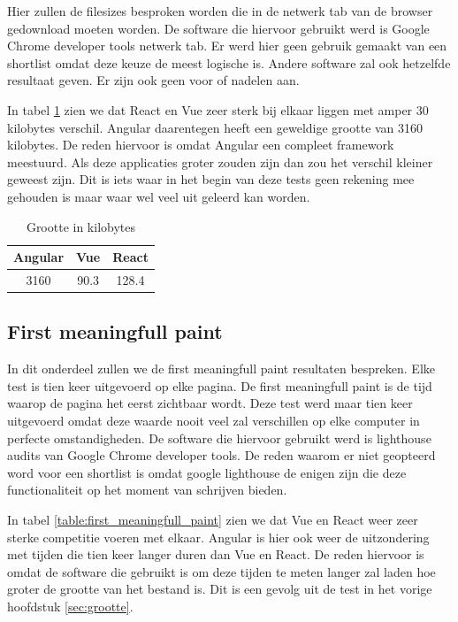Hier zullen de filesizes besproken worden die in de netwerk tab van de browser gedownload moeten worden. De software die hiervoor gebruikt werd is Google Chrome developer tools netwerk tab. Er werd hier geen gebruik gemaakt van een shortlist omdat deze keuze de meest logische is. Andere software zal ook hetzelfde resultaat geven. Er zijn ook geen voor of nadelen aan.

In tabel \ref{table:file_sizes} zien we dat React en Vue zeer sterk bij elkaar liggen met amper 30 kilobytes verschil. Angular daarentegen heeft een geweldige grootte van 3160 kilobytes. De reden hiervoor is omdat Angular een compleet framework meestuurd. Als deze applicaties groter zouden zijn dan zou het verschil kleiner geweest zijn. Dit is iets waar in het begin van deze tests geen rekening mee gehouden is maar waar wel veel uit geleerd kan worden.

\begin{table}[]
	\centering
	\caption{Grootte in kilobytes}
	\label{table:file_sizes}
	\begin{tabular}{|c|c|c|} \hline
		Angular &Vue   &React \\ \hline
		3160     &90.3  &128.4 \\ \hline
	\end{tabular}
\end{table}

\subsection{First meaningfull paint}
\label{sec:first_meaningfull_paint}

In dit onderdeel zullen we de first meaningfull paint resultaten bespreken. Elke test is tien keer uitgevoerd op elke pagina. De first meaningfull paint is de tijd waarop de pagina het eerst zichtbaar wordt. Deze test werd maar tien keer uitgevoerd omdat deze waarde nooit veel zal verschillen op elke computer in perfecte omstandigheden. De software die hiervoor gebruikt werd is lighthouse audits van Google Chrome developer tools. De reden waarom er niet geopteerd word voor een shortlist is omdat google lighthouse de enigen zijn die deze functionaliteit op het moment van schrijven bieden.

In tabel \ref{table:first_meaningfull_paint} zien we dat Vue en React weer zeer sterke competitie voeren met elkaar. Angular is hier ook weer de uitzondering met tijden die tien keer langer duren dan Vue en React. De reden hiervoor is omdat de software die gebruikt is om deze tijden te meten langer zal laden hoe groter de grootte van het bestand is. Dit is een gevolg uit de test in het vorige hoofdstuk \ref{sec:grootte}.

